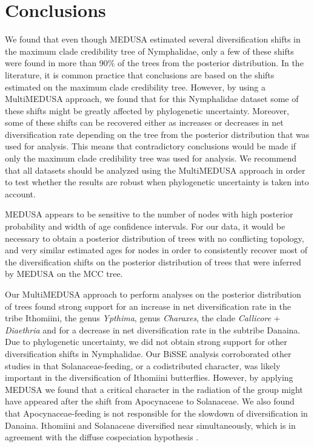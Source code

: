 \documentclass[10pt,letterpaper]{article}
\begin{document}
\section*{Conclusions}
We found that even though MEDUSA estimated several diversification
shifts in the maximum clade credibility tree of Nymphalidae, only a few
of these shifts were found in more than 90\% of the trees from the
posterior distribution. In the literature, it is common practice that
conclusions are based on the shifts estimated on the maximum clade
credibility tree. However, by using a MultiMEDUSA approach, we found
that for this Nymphalidae dataset some of these shifts might be greatly
affected by phylogenetic uncertainty. Moreover, some of these shifts can
be recovered either as increases or decreases in net diversification
rate depending on the tree from the posterior distribution that was used
for analysis. This means that contradictory conclusions would be made if
only the maximum clade credibility tree was used for analysis.
We recommend that all datasets should be analyzed using the MultiMEDUSA
approach in order to test whether the results are robust
when phylogenetic uncertainty is taken into account.

MEDUSA appears to be sensitive to the number of nodes with high
posterior probability and width of age confidence intervals. For our
data, it would be necessary to obtain a posterior distribution of trees
with no conflicting topology, and very similar estimated ages for nodes
in order to consistently recover most of the diversification shifts on
the posterior distribution of trees that were inferred by MEDUSA on the
MCC tree.

Our MultiMEDUSA approach to perform analyses on the posterior
distribution of trees found strong support for an increase in net
diversification rate in the tribe Ithomiini, the genus \emph{Ypthima},
genus \emph{Charaxes}, the clade \emph{Callicore} + \emph{Diaethria} and for a
decrease in net diversification rate in the
subtribe Danaina. Due to phylogenetic uncertainty, we did not obtain
strong support for other diversification shifts in Nymphalidae. Our
BiSSE analysis corroborated other studies in that Solanaceae-feeding,
or a codistributed character, was likely important in the
diversification of Ithomiini butterflies. However, by applying MEDUSA we
found that a critical character in the radiation of the group might have
appeared after the shift from Apocynaceae to Solanaceae. We also found
that Apocynaceae-feeding is not responsible for the
slowdown of diversification in Danaina. Ithomiini and Solanaceae
diversified near simultaneously, which is in agreement with the diffuse
cospeciation hypothesis \cite{nyman2012, janz2011}.
\end{document}
